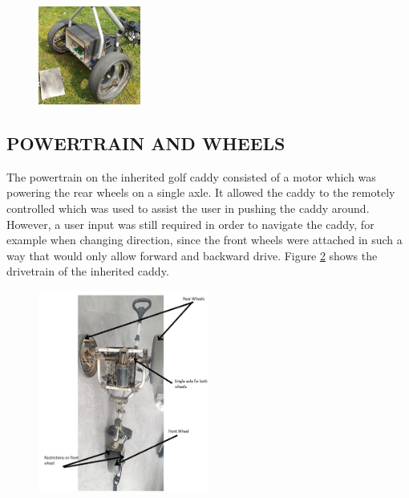 \documentclass[11pt,landscape]{article}
\begin{document}
\begin{multicols}{2}
\begin{figure}[H]
    \begin{center}
        \includegraphics[width=0.3\textwidth]{Figure37.jpg}
        \label{fig:blackcaddy}
    \end{center}
\end{figure}
    
    \subsection{POWERTRAIN AND WHEELS}
    The powertrain on the inherited golf caddy consisted of a motor which was
    powering the rear wheels on a single axle. It allowed the caddy to the
    remotely controlled which was used to assist the user in pushing the caddy
    around. However, a user input was still required in order to navigate the
    caddy, for example when changing direction, since the front wheels were
    attached in such a way that would only allow forward and backward drive.
    Figure \ref{fig:train} shows the drivetrain of the inherited caddy.
    
    \begin{figure}[H]
        \begin{center}
            \includegraphics[width=0.5\textwidth]{Figure25.jpg}
            \label{fig:train}
        \end{center}
    \end{figure}
    

\end{multicols}
\end{document}
